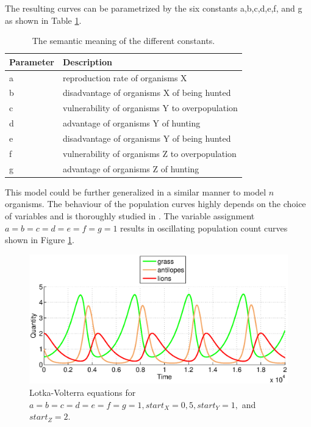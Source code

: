 \documentclass[11pt]{article}
\begin{document}
The resulting curves can be parametrized by the six constants a,b,c,d,e,f, and g as shown in Table \ref{tab:LotkaVolterraParameters}.

\begin{table}[htbp]
\centering
\begin{tabular}{l|l}
Parameter & Description \\ 
\hline 
\hline 
a & reproduction rate of organisms X\\ 
\hline 
b & disadvantage of organisms X of being hunted\\ 
\hline 
c & vulnerability of organisms Y to overpopulation\\  
\hline 
d & advantage of organisms Y of hunting\\
\hline 
e & disadvantage of organisms Y of being hunted\\
\hline 
f & vulnerability of organisms Z to overpopulation\\
\hline 
g & advantage of organisms Z of hunting\\
\end{tabular}
\caption{The semantic meaning of the different constants.}
\label{tab:LotkaVolterraParameters}
\end{table}

This model could be further generalized in a similar manner to model $n$ organisms. The behaviour of the population curves highly depends on the choice of variables and is thoroughly studied in \cite{lotkaVolterraThreeSpecies}. The variable assignment $a=b=c=d=e=f=g=1$ results in oscillating population count curves shown in Figure \ref{fig:LotkaVolterraThreeAllOnes}. 

\begin{figure}
\centering
\includegraphics[scale=0.65]{LotkaVolterraThreeAllOnes.eps}
\caption{Lotka-Volterra equations for $a=b=c=d=e=f=g=1,start_X=0,5, start_Y=1,$ and $start_Z=2$.}
\label{fig:LotkaVolterraThreeAllOnes}
\end{figure}
\end{document}

